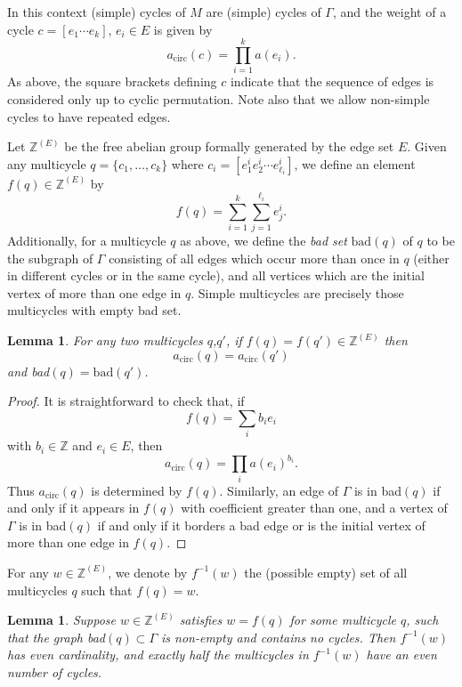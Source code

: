 \documentclass[11pt,hyp,]{nyjm}
\newcommand{\Z}{\mathbb{Z}}
\numberwithin{thm}{section}
\newtheorem{lemma}[thm]{Lemma}
\theoremstyle{definition}
\theoremstyle{remark}
\begin{document}
	In this context (simple) cycles of $M$ are (simple) cycles of $\Gamma$, and the weight of a cycle $c = [e_1 \cdots e_k]$, $e_i \in E$ is given by
	$$
	a_\text{circ}(c) = \prod_{i = 1}^k a(e_i).
	$$
	As above, the square brackets defining $c$ indicate that the sequence of edges is considered only up to cyclic permutation. Note also that we allow non-simple cycles to have repeated edges.
	
	Let $\Z^{(E)}$ be the free abelian group formally generated by the edge set $E$. Given any multicycle $q = \{c_1, \dots, c_k\}$ where $c_i = [e^i_1e^i_2 \cdots e^i_{\ell_i}]$, we define an element $f(q) \in \Z^{(E)}$ by
	$$
	f(q) = \sum_{i = 1}^k \sum_{j = 1}^{\ell_i} e^i_j.
	$$
	Additionally, for a multicycle $q$ as above, we define the {\em bad set} $\text{bad}(q)$ of $q$ to be the subgraph of $\Gamma$ consisting of all edges which occur more than once in $q$ (either in different cycles or in the same cycle), and all vertices which are the initial vertex of more than one edge in $q$. Simple multicycles are precisely those multicycles with empty bad set.
	
	\begin{lemma}
		\label{lem:annoying1}
		For any two multicycles $q$,$q'$, if $f(q) = f(q') \in \Z^{(E)}$ then
		$$
		a_\text{circ}(q) = a_\text{circ}(q')
		$$
		and bad$(q) = \text{bad}(q')$.
	\end{lemma}
	
	\begin{proof}
		It is straightforward to check that, if
		$$
		f(q) = \sum_i b_ie_i
		$$
		with $b_i \in \Z$ and $e_i \in E$, then
		$$
		a_\text{circ}(q) = \prod_i a(e_i)^{b_i}.
		$$
		Thus $a_\text{circ}(q)$ is determined by $f(q)$. Similarly, an edge of $\Gamma$ is in bad$(q)$ if and only if it appears in $f(q)$ with coefficient greater than one, and a vertex of $\Gamma$ is in bad$(q)$ if and only if it borders a bad edge or is the initial vertex of more than one edge in $f(q)$.
	\end{proof}

	For any $w \in \Z^{(E)}$, we denote by $f^{-1}(w)$ the (possible empty) set of all multicycles $q$ such that $f(q) = w$.
	
	\begin{lemma}
		\label{lem:fun1}
		Suppose $w \in \Z^{(E)}$ satisfies $w = f(q)$ for some multicycle $q$, such that the graph bad$(q) \subset \Gamma$ is non-empty and contains no cycles. Then $f^{-1}(w)$ has even cardinality, and exactly half the multicycles in $f^{-1}(w)$ have an even number of cycles.
	\end{lemma}
	
\end{document}

